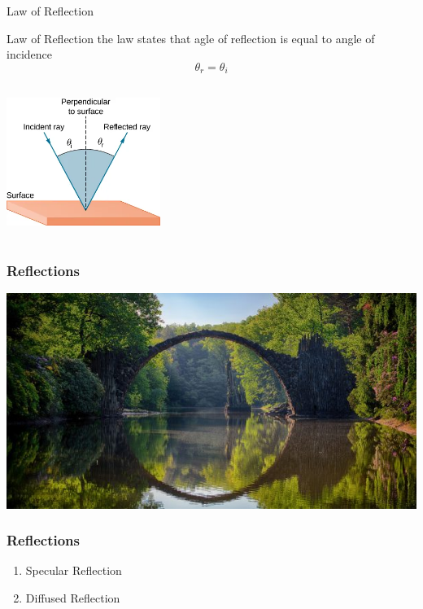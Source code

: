 \documentclass{beamer}
\begin{document}
\begin{frame}{Law of Reflection}
	\begin{block}{Law of Reflection}
		the law states that agle of reflection is equal to angle of incidence
		\begin{displaymath}
			\theta_{r} = \theta_{i}
		\end{displaymath}
	\end{block}
	\begin{center}
		\includegraphics[width=5cm, height=5cm]{2.png}
	\end{center}
\end{frame}

\begin{frame}
	\frametitle{Reflections}
	\begin{center}
		\includegraphics[scale=0.8]{3.jpg}	
	\end{center}
\end{frame}

\begin{frame}
	\frametitle{Reflections}
	\begin{enumerate}
		\pause
		\item Specular Reflection 
		 \pause
		\item Diffused Reflection  
	\end{enumerate}
\end{frame}
\end{document}
